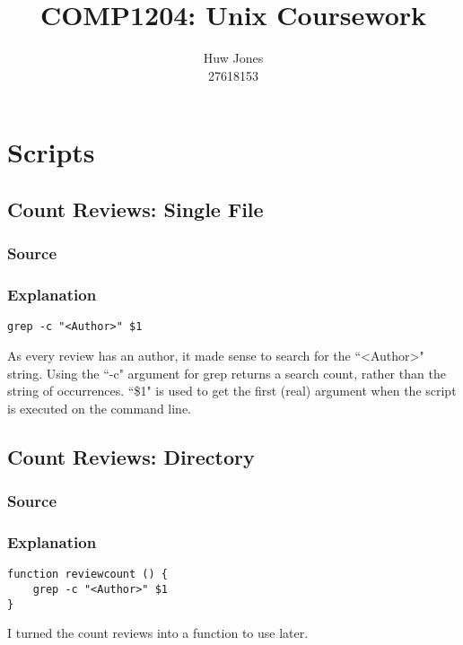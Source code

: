 \documentclass[a4paper]{article}
\author{Huw Jones \\27618153}
\title{COMP1204: Unix Coursework}
\begin{document}
\maketitle
\newpage

\section{Scripts}

%
\subsection{Count Reviews: Single File}

\subsubsection{Source}



\subsubsection{Explanation}

\begin{lstlisting}
grep -c "<Author>" $1
\end{lstlisting}
As every review has an author, it made sense to search for the ``\textless Author\textgreater" string.
Using the ``-c" argument for grep returns a search count, rather than the string of occurrences.
``\$1" is used to get the first (real) argument when the script is executed on the command line.

%
\subsection{Count Reviews: Directory}

\subsubsection{Source}



\subsubsection{Explanation}

\begin{lstlisting}
function reviewcount () {
	grep -c "<Author>" $1
}
\end{lstlisting}
I turned the count reviews into a function to use later.
\end{document}
